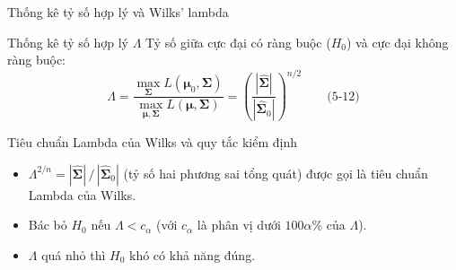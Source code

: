 \begin{frame}[t]{Thống kê tỷ số hợp lý và Wilks’ lambda}
  \begin{block}{Thống kê tỷ số hợp lý $\Lambda$}
    Tỷ số giữa cực đại có ràng buộc ($H_0$) và cực đại không ràng buộc:
    \vspace{-4pt}
    \[
      \Lambda = \frac{\max\limits_{\boldsymbol{\Sigma}} L(\boldsymbol{\mu}_0, \boldsymbol{\Sigma})}{\max\limits_{\boldsymbol{\mu}, \boldsymbol{\Sigma}} L(\boldsymbol{\mu}, \boldsymbol{\Sigma})}
      = \left( \frac{|\hat{\boldsymbol{\Sigma}}|}{|\hat{\boldsymbol{\Sigma}}_0|} \right)^{n/2} \qquad \text{(5-12)}
    \]
    \vspace{-8pt}
  \end{block}

  \begin{exampleblock}{Tiêu chuẩn Lambda của Wilks và quy tắc kiểm định}
    \begin{itemize}
      \item $\Lambda^{2/n} = |\hat{\boldsymbol{\Sigma}}| \,/\, |\hat{\boldsymbol{\Sigma}}_0|$ (tỷ số hai phương sai tổng quát) được gọi là tiêu chuẩn Lambda của Wilks.
      \item Bác bỏ $H_0$ nếu $\Lambda < c_\alpha$ (với $c_\alpha$ là phân vị dưới $100\alpha\%$ của $\Lambda$).
      \item $\Lambda$ quá nhỏ thì $H_0$ khó có khả năng đúng.
    \end{itemize}
  \end{exampleblock}
\end{frame}


